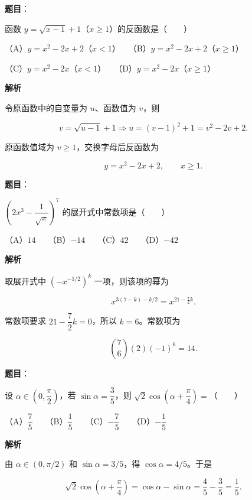\begin{answer}

\textbf{题目}：

函数 $y=\sqrt{x-1}+1$（$x\geqslant1$）的反函数是\mbox{（　　）}

（A）$y=x^2-2x+2$（$x<1$）　　（B）$y=x^2-2x+2$（$x\geqslant1$）

（C）$y=x^2-2x$（$x<1$）　　（D）$y=x^2-2x$（$x\geqslant1$）

\textbf{解析}

令原函数中的自变量为 $u$、函数值为 $v$，则

\nopagebreak[4]
\[
v=\sqrt{u-1}+1
\Longrightarrow
u=(v-1)^2+1=v^2-2v+2.
\]

原函数值域为 $v\geqslant1$，交换字母后反函数为

\nopagebreak[4]
\[
y=x^2-2x+2,\qquad x\geqslant1.
\]


\end{answer}
\begin{answer}

\textbf{题目}：

$\left(2x^3-\dfrac1{\sqrt{x}}\right)^7$ 的展开式中常数项是\mbox{（　　）}

（A）$14$　　（B）$-14$　　（C）$42$　　（D）$-42$

\textbf{解析}

取展开式中 $\left(-x^{-1/2}\right)^k$ 一项，则该项的幂为

\nopagebreak[4]
\[
x^{3(7-k)-k/2}=x^{21-\frac72k}.
\]

常数项要求 $21-\dfrac72k=0$，所以 $k=6$。常数项为

\nopagebreak[4]
\[
\binom76(2)(-1)^6=14.
\]


\end{answer}
\begin{answer}

\textbf{题目}：

设 $\alpha\in\left(0,\dfrac\pi2\right)$，若 $\sin\alpha=\dfrac35$，则 $\sqrt2\cos\left(\alpha+\dfrac\pi4\right)=$\mbox{（　　）}

（A）$\dfrac75$　　（B）$\dfrac15$　　（C）$-\dfrac75$　　（D）$-\dfrac15$

\textbf{解析}

由 $\alpha\in(0,\pi/2)$ 和 $\sin\alpha=3/5$，得 $\cos\alpha=4/5$。于是

\nopagebreak[4]
\[
\sqrt2\cos\left(\alpha+\frac\pi4\right)
=\cos\alpha-\sin\alpha
=\frac45-\frac35=\frac15.
\]


\end{answer}
